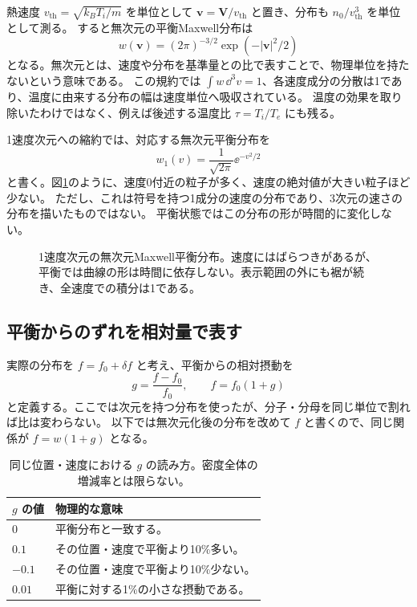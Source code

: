 熱速度 $v_{\mathrm{th}}=\sqrt{k_BT_i/m}$ を単位として $\bm v=\bm V/v_{\mathrm{th}}$ と置き、分布も $n_0/v_{\mathrm{th}}^3$ を単位として測る。
すると無次元の平衡Maxwell分布は
\begin{equation}
w(\bm v)=(2\pi)^{-3/2}\exp(-|\bm v|^2/2)
\label{eq:maxwell}
\end{equation}
となる。無次元とは、速度や分布を基準量との比で表すことで、物理単位を持たないという意味である。
この規約では $\int w\,\dd^3v=1$、各速度成分の分散は1であり、温度に由来する分布の幅は速度単位へ吸収されている。
温度の効果を取り除いたわけではなく、例えば後述する温度比 $\tau=T_i/T_e$ にも残る。

1速度次元への縮約では、対応する無次元平衡分布を
\[
\boxed{w_1(v)=\frac{1}{\sqrt{2\pi}}\ee^{-v^2/2}}
\]
と書く。図\ref{fig:maxwell-equilibrium}のように、速度0付近の粒子が多く、速度の絶対値が大きい粒子ほど少ない。
ただし、これは符号を持つ1成分の速度の分布であり、3次元の速さの分布を描いたものではない。
平衡状態ではこの分布の形が時間的に変化しない。

\begin{figure}[htbp]
\centering

\caption{1速度次元の無次元Maxwell平衡分布。速度にはばらつきがあるが、平衡では曲線の形は時間に依存しない。表示範囲の外にも裾が続き、全速度での積分は1である。}
\label{fig:maxwell-equilibrium}
\end{figure}

\subsection{平衡からのずれを相対量で表す}
実際の分布を $f=f_0+\delta f$ と考え、平衡からの相対摂動を
\[
\boxed{g=\frac{f-f_0}{f_0}},\qquad \boxed{f=f_0(1+g)}
\]
と定義する。ここでは次元を持つ分布を使ったが、分子・分母を同じ単位で割れば比は変わらない。
以下では無次元化後の分布を改めて $f$ と書くので、同じ関係が $f=w(1+g)$ となる。

\begin{table}[htbp]
\centering
\caption{同じ位置・速度における $g$ の読み方。密度全体の増減率とは限らない。}
\begin{tabularx}{.92\textwidth}{lX}
\toprule $g$ の値 & 物理的な意味 \\\midrule
$0$ & 平衡分布と一致する。\\
$0.1$ & その位置・速度で平衡より10\%多い。\\
$-0.1$ & その位置・速度で平衡より10\%少ない。\\
$0.01$ & 平衡に対する1\%の小さな摂動である。\\
\bottomrule
\end{tabularx}
\end{table}

